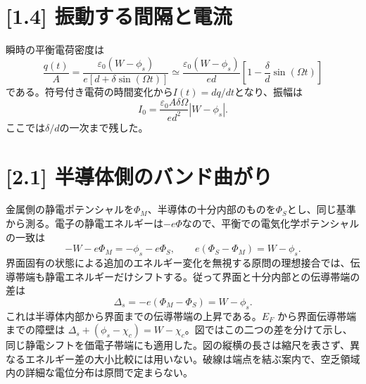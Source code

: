 \documentclass[11pt,a4paper]{article}
\begin{document}
\section*{[1.4] 振動する間隔と電流}
瞬時の平衡電荷密度は
\begin{equation}
 \frac{q(t)}{A}=\frac{\varepsilon_0(W-\phi_s)}{e[d+\delta\sin(\Omega t)]}
 \simeq\frac{\varepsilon_0(W-\phi_s)}{ed}
 \left[1-\frac{\delta}{d}\sin(\Omega t)\right]
\end{equation}
である。符号付き電荷の時間変化から$ I(t)=dq/dt$となり、振幅は
\begin{equation}
 \boxed{I_0=\frac{\varepsilon_0A\delta\Omega}{ed^2}|W-\phi_s|}.
\end{equation}
ここでは$\delta/d$の一次まで残した。

\section*{[2.1] 半導体側のバンド曲がり}
金属側の静電ポテンシャルを$\Phi_M$、半導体の十分内部のものを$\Phi_S$とし、同じ基準から測る。電子の静電エネルギーは$-e\Phi$なので、平衡での電気化学ポテンシャルの一致は
\begin{equation}
 -W-e\Phi_M=-\phi_s-e\Phi_S,\qquad
 e(\Phi_S-\Phi_M)=W-\phi_s.
\end{equation}
界面固有の状態による追加のエネルギー変化を無視する原問の理想接合では、伝導帯端も静電エネルギーだけシフトする。従って界面と十分内部との伝導帯端の差は
\begin{equation}
 \boxed{\Delta_s=-e(\Phi_M-\Phi_S)=W-\phi_s}.
\end{equation}
これは半導体内部から界面までの伝導帯端の上昇である。$E_F$ から界面伝導帯端までの障壁は $\Delta_s+(\phi_s-\chi_c)=W-\chi_c$。図ではこの二つの差を分けて示し、同じ静電シフトを価電子帯端にも適用した。図の縦横の長さは縮尺を表さず、異なるエネルギー差の大小比較には用いない。破線は端点を結ぶ案内で、空乏領域内の詳細な電位分布は原問で定まらない。
\end{document}
